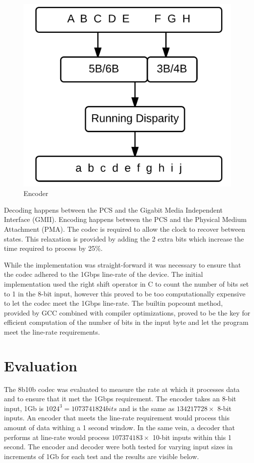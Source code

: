 \documentclass[conference]{IEEEtran}
\begin{document}
\begin{figure}[h!]
  \centering
  \includegraphics[scale=0.50]{encoder}
  \caption{Encoder}
  \label{fig:encoder}
\end{figure}

Decoding happens between the PCS and the Gigabit Media Independent Interface (GMII). Encoding happens between the PCS and the Physical Medium  Attachment (PMA). The codec is required to allow the clock to recover between states. This relaxation is provided by adding the 2 extra bits which increase the time required to process by 25\%.

While the implementation was straight-forward it was necessary to ensure that the codec adhered to the 1Gbps line-rate of the device. The initial implementation used the right shift operator in C to count the number of bits set to 1 in the 8-bit input, however this proved to be too computationally expensive to let the codec meet the 1Gbps line-rate. The builtin popcount method, provided by GCC combined with compiler optimizations, proved to be the key for efficient computation of the number of bits in the input byte and let the program meet the line-rate requirements.

\section{Evaluation}

The 8b10b codec was evaluated to measure the rate at which it processes data and to ensure that it met the 1Gbps requirement. The encoder takes an 8-bit input, 1Gb is $1024^3 = 1073741824bits$ and is the same as $134217728 \times$ 8-bit inputs. An encoder that meets the line-rate requirement would process this amount of data withing a 1 second window. In the same vein, a decoder that performs at line-rate would process $107374183 \times$ 10-bit inputs within this 1 second. The encoder and decoder were both tested for varying input sizes in increments of 1Gb for each test and the results are visible below.
\end{document}
